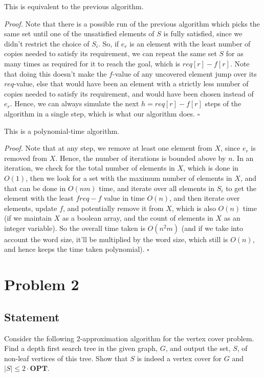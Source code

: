\documentclass[a4paper]{article}
\newenvironment{proof}{\begin{breakbox}\textit{Proof.}}{\hfill$\square$\end{breakbox}}
\newcommand{\OPT}{\mathbf{OPT}}
\begin{document}
\begin{claim}
    This is equivalent to the previous algorithm.
\end{claim}
\begin{proof}
    Note that there is a possible run of the previous algorithm which picks the same set until one of the unsatisfied elements of $S$ is fully satisfied, since we didn't restrict the choice of $S_i$. So,
    if $e_r$ is an element with the least number of copies needed to satisfy its requirement, we can repeat the same set $S$ for as many times as required for it to reach the goal, which is
    $req[r] - f[r]$. Note that doing this doesn't make the $f$-value of any uncovered element jump over its $req$-value, else that would have been an element with a strictly less number of copies
    needed to satisfy its requirement, and would have been chosen instead of $e_r$. Hence, we can always simulate the next $h = req[r] - f[r]$ steps of the algorithm in a single step, which is
    what our algorithm does.
\end{proof}

\begin{claim}
    This is a polynomial-time algorithm.
\end{claim}
\begin{proof}
    Note that at any step, we remove at least one element from $X$, since $e_r$ is removed from $X$. Hence, the number of iterations is bounded above by $n$. In an iteration, we check for
    the total number of elements in $X$, which is done in $O(1)$, then we look for a
    set with the maximum number of elements in $X$, and that can be done in $O(nm)$ time, and iterate over all elements in $S_i$ to get the element with the least $freq - f$ value in time $O(n)$,
    and then iterate over elements, update $f$, and potentially remove it from $X$, which is also $O(n)$ time (if we maintain $X$ as a boolean array, and the count of elements in $X$ as an
    integer variable). So the overall time taken is $O(n^2m)$ (and if we take into account the word size, it'll be multiplied by the word size, which still is $O(n)$, and hence keeps the time
    taken polynomial).
\end{proof}

\newpage

\section{Problem 2}
\subsection{Statement}
Consider the following 2-approximation algorithm for the vertex cover problem. Find a depth first search tree in the given graph, $G$, and output the set, $S$, of non-leaf vertices of this tree. Show
that $S$ is indeed a vertex cover for $G$ and $|S| \le 2 \cdot \OPT$.
\end{document}
